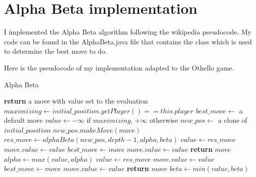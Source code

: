 \section{Alpha Beta implementation}

I implemented the Alpha Beta algorithm following the wikipedia pseudocode.
My code can be found in the AlphaBeta.java file that contains the class which is used to determine the best move to do.

Here is the pseudocode of my implementation adapted to the Othello game.

\FloatBarrier
\begin{algorithm}
    \caption{Alpha Beta}
    \begin{algorithmic}[1]
                \State \textbf{return} a move with value set to the evaluation
            \EndIf
            \State $maximizing \gets initial\_position.getPlayer() == this.player$
            \State $best\_move \gets$ a default move
            \State $value \gets -\infty$ if $maximizing$, $+\infty$ otherwise
                \State $new\_pos \gets$ a clone of $initial\_position$    
                \State $new\_pos.makeMove(move)$
                \State $res\_move \gets alphaBeta(new\_pos, depth - 1, alpha, beta)$
                        \State $value \gets res\_move$
                        \State $move.value \gets value$
                        \State $best\_move \gets move$
                    \EndIf
                        \State $move.value \gets value$
                        \State \textbf{return} $move$
                    \EndIf
                    \State $alpha \gets max(value, alpha)$
                \Else
                        \State $value \gets res\_move$
                        \State $move.value \gets value$
                        \State $best\_move \gets move$
                    \EndIf
                        \State $move.value \gets value$
                        \State \textbf{return} $move$
                    \EndIf
                    \State $beta \gets min(value, beta)$
                \EndIf
            \EndFor
        \EndProcedure
    \end{algorithmic}
\end{algorithm}
\FloatBarrier

